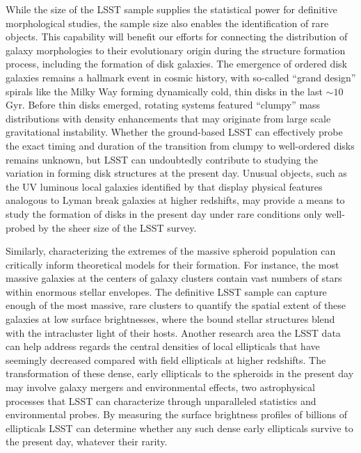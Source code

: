 {While the size of the LSST sample supplies the
statistical power for definitive morphological studies,
the sample size also enables the identification of rare
objects. This capability will benefit our efforts for
connecting the distribution of galaxy morphologies to their
evolutionary origin during the structure formation process,
including the formation of disk galaxies.
The emergence of ordered disk galaxies remains a hallmark
event in cosmic history, with so-called ``grand design''
spirals like the Milky Way forming dynamically cold, thin
disks in the last $\sim10$ Gyr. Before thin disks emerged,
rotating systems featured ``clumpy'' mass distributions with
density enhancements
that may originate from large scale gravitational instability.
Whether the ground-based LSST can effectively probe
the exact timing and duration of the transition from
clumpy to well-ordered disks remains 
unknown, but LSST can undoubtedly contribute to studying the
variation in forming disk structures at the present day.
Unusual objects, such as the UV luminous local galaxies identified
by \citet{heckman2005a} that display physical features analogous to 
Lyman break galaxies at higher redshifts, may provide a 
means to study the formation of disks in the present day
under rare conditions only well-probed by the sheer size
of the LSST survey.

Similarly, characterizing the extremes of the
massive spheroid population can critically inform
theoretical models for their formation. For instance,
the most massive galaxies at the centers of galaxy clusters
contain vast numbers of stars within enormous stellar
envelopes. The definitive LSST sample can capture enough
of the most massive, rare clusters to quantify the 
spatial extent of these galaxies at
low surface brightnesses, where the bound stellar
structures blend with the intracluster light of
their hosts. Another research area the LSST data
can help address regards the central densities of local
ellipticals that have seemingly decreased compared with
field ellipticals at higher redshifts. The transformation
of these dense, early ellipticals to the spheroids in the
present day may involve galaxy mergers and environmental
effects, two astrophysical processes that LSST can characterize
through unparalleled statistics and environmental probes.
By measuring the
surface brightness profiles of billions of 
ellipticals LSST can determine whether any such dense
early ellipticals survive to the present day, whatever
their rarity.

}
